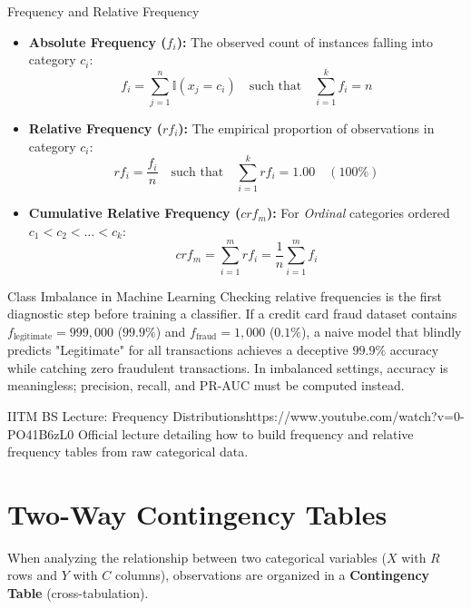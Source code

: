 \begin{definitionbox}{Frequency and Relative Frequency}
\begin{itemize}
    \item \textbf{Absolute Frequency ($f_i$):} The observed count of instances falling into category $c_i$:
    $$f_i = \sum_{j=1}^n \mathbb{I}(x_j = c_i) \quad \text{such that} \quad \sum_{i=1}^k f_i = n$$
    \item \textbf{Relative Frequency ($rf_i$):} The empirical proportion of observations in category $c_i$:
    $$rf_i = \frac{f_i}{n} \quad \text{such that} \quad \sum_{i=1}^k rf_i = 1.00 \quad (100\%)$$
    \item \textbf{Cumulative Relative Frequency ($crf_m$):} For \emph{Ordinal} categories ordered $c_1 < c_2 < \dots < c_k$:
    $$crf_m = \sum_{i=1}^m rf_i = \frac{1}{n}\sum_{i=1}^m f_i$$
\end{itemize}
\end{definitionbox}

\begin{intuitionbox}{Class Imbalance in Machine Learning}
Checking relative frequencies is the first diagnostic step before training a classifier. If a credit card fraud dataset contains $f_{\text{legitimate}} = 999{,}000$ ($99.9\%$) and $f_{\text{fraud}} = 1{,}000$ ($0.1\%$), a naive model that blindly predicts "Legitimate" for all transactions achieves a deceptive $99.9\%$ accuracy while catching zero fraudulent transactions. In imbalanced settings, accuracy is meaningless; precision, recall, and PR-AUC must be computed instead.
\end{intuitionbox}

\begin{videocard}{IITM BS Lecture: Frequency Distributions}{https://www.youtube.com/watch?v=0-PO41B6zL0}
Official lecture detailing how to build frequency and relative frequency tables from raw categorical data.
\end{videocard}

\section{Two-Way Contingency Tables}

When analyzing the relationship between two categorical variables ($X$ with $R$ rows and $Y$ with $C$ columns), observations are organized in a \textbf{Contingency Table} (cross-tabulation).


